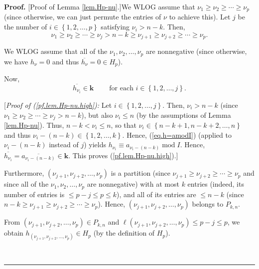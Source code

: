 \documentclass[numbers=enddot,12pt,final,onecolumn,notitlepage]{scrartcl}%
\theoremstyle{definition}
\newenvironment{proof}[1][Proof]{\noindent\textbf{#1.} }{\ \rule{0.5em}{0.5em}}
\begin{document}
\begin{proof}
[Proof of Lemma \ref{lem.Hp-nu}.]We WLOG assume that $\nu_{1}\geq\nu_{2}%
\geq\cdots\geq\nu_{p}$ (since otherwise, we can just permute the entries of
$\nu$ to achieve this). Let $j$ be the number of $i\in\left\{  1,2,\ldots
,p\right\}  $ satisfying $\nu_{i}>n-k$. Then,%
\[
\nu_{1}\geq\nu_{2}\geq\cdots\geq\nu_{j}>n-k\geq\nu_{j+1}\geq\nu_{j+2}%
\geq\cdots\geq\nu_{p}.
\]


We WLOG assume that all of the $\nu_{1},\nu_{2},\ldots,\nu_{p}$ are
nonnegative (since otherwise, we have $h_{\nu}=0$ and thus $\overline{h_{\nu}%
}=0\in H_{p}$).

Now,
\begin{equation}
\overline{h_{\nu_{i}}}\in\mathbf{k}\ \ \ \ \ \ \ \ \ \ \text{for each }%
i\in\left\{  1,2,\ldots,j\right\}  . \label{pf.lem.Hp-nu.high}%
\end{equation}


[\textit{Proof of (\ref{pf.lem.Hp-nu.high}):} Let $i\in\left\{  1,2,\ldots
,j\right\}  $. Then, $\nu_{i}>n-k$ (since $\nu_{1}\geq\nu_{2}\geq\cdots\geq
\nu_{j}>n-k$), but also $\nu_{i}\leq n$ (by the assumptions of Lemma
\ref{lem.Hp-nu}). Thus, $n-k<\nu_{i}\leq n$, so that $\nu_{i}\in\left\{
n-k+1,n-k+2,\ldots,n\right\}  $ and thus $\nu_{i}-\left(  n-k\right)
\in\left\{  1,2,\ldots,k\right\}  $. Hence, (\ref{eq.h=amodI}) (applied to
$\nu_{i}-\left(  n-k\right)  $ instead of $j$) yields $h_{\nu_{i}}\equiv
a_{\nu_{i}-\left(  n-k\right)  }\operatorname{mod}I$. Hence, $\overline
{h_{\nu_{i}}}=\overline{a_{\nu_{i}-\left(  n-k\right)  }}\in\mathbf{k}$. This
proves (\ref{pf.lem.Hp-nu.high}).]

Furthermore, $\left(  \nu_{j+1},\nu_{j+2},\ldots,\nu_{p}\right)  $ is a
partition (since $\nu_{j+1}\geq\nu_{j+2}\geq\cdots\geq\nu_{p}$ and since all
of the $\nu_{1},\nu_{2},\ldots,\nu_{p}$ are nonnegative) with at most $k$
entries (indeed, its number of entries is $\leq p-j\leq p\leq k$), and all of
its entries are $\leq n-k$ (since $n-k\geq\nu_{j+1}\geq\nu_{j+2}\geq\cdots
\geq\nu_{p}$). Hence, $\left(  \nu_{j+1},\nu_{j+2},\ldots,\nu_{p}\right)  $
belongs to $P_{k,n}$.

From $\left(  \nu_{j+1},\nu_{j+2},\ldots,\nu_{p}\right)  \in P_{k,n}$ and
$\ell\left(  \nu_{j+1},\nu_{j+2},\ldots,\nu_{p}\right)  \leq p-j\leq p$, we
obtain $\overline{h_{\left(  \nu_{j+1},\nu_{j+2},\ldots,\nu_{p}\right)  }}\in
H_{p}$ (by the definition of $H_{p}$).


\end{proof}
\end{document}
